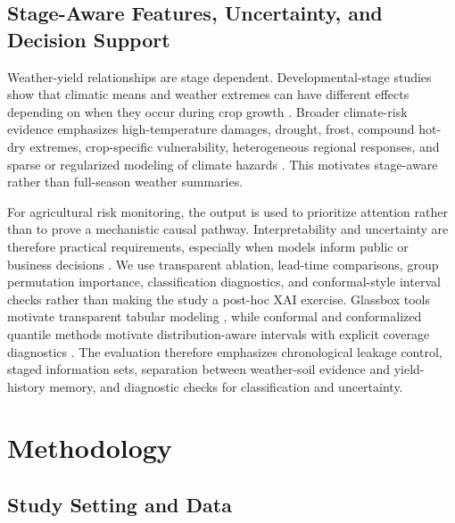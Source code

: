 \documentclass[wcp]{jmlr}
\begin{document}
\subsection{Stage-Aware Features, Uncertainty, and Decision Support}

Weather-yield relationships are stage dependent. Developmental-stage studies show that climatic means and weather extremes can have different effects depending on when they occur during crop growth \citep{schierhorn2021developmentalStages}. Broader climate-risk evidence emphasizes high-temperature damages, drought, frost, compound hot-dry extremes, crop-specific vulnerability, heterogeneous regional responses, and sparse or regularized modeling of climate hazards \citep{schauberger2017temperature,heino2023hotDryExtremes,sjulgard2023swedenAnomalies,heilemann2024lassoExtremes,kabtih2025hotPluvial}. This motivates stage-aware rather than full-season weather summaries.

For agricultural risk monitoring, the output is used to prioritize attention rather than to prove a mechanistic causal pathway. Interpretability and uncertainty are therefore practical requirements, especially when models inform public or business decisions \citep{rudin2022blackboxBrief,paudel2023interpretability}. We use transparent ablation, lead-time comparisons, group permutation importance, classification diagnostics, and conformal-style interval checks rather than making the study a post-hoc XAI exercise. Glassbox tools motivate transparent tabular modeling \citep{nori2019interpretml}, while conformal and conformalized quantile methods motivate distribution-aware intervals with explicit coverage diagnostics \citep{romano2019cqr,angelopoulos2023conformal}. The evaluation therefore emphasizes chronological leakage control, staged information sets, separation between weather-soil evidence and yield-history memory, and diagnostic checks for classification and uncertainty.

\vspace{-0.8em}
\section{Methodology}
\vspace{-0.4em}

\subsection{Study Setting and Data}
\vspace{-0.3em}
\end{document}
